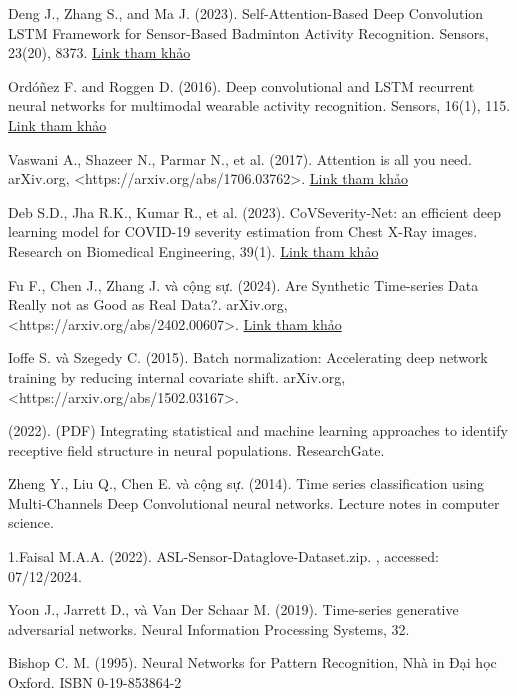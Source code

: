 \newpage
{}
\renewcommand\refname{Tài liệu tham khảo}
\begin{thebibliography}{3}
    \item Deng J., Zhang S., and Ma J. (2023). Self-Attention-Based Deep Convolution LSTM Framework for Sensor-Based Badminton Activity Recognition. Sensors, 23(20), 8373. \href{https://doi.org/10.3390/s23208373}{Link tham khảo}
    \item Ordóñez F. and Roggen D. (2016). Deep convolutional and LSTM recurrent neural networks for multimodal wearable activity recognition. Sensors, 16(1), 115. \href{https://doi.org/10.3390/s16010115}{Link tham khảo}
    \item Vaswani A., Shazeer N., Parmar N., et al. (2017). Attention is all you need. arXiv.org, <https://arxiv.org/abs/1706.03762>. \href{https://arxiv.org/abs/1706.03762}{Link tham khảo}
    \item Deb S.D., Jha R.K., Kumar R., et al. (2023). CoVSeverity-Net: an efficient deep learning model for COVID-19 severity estimation from Chest X-Ray images. Research on Biomedical Engineering, 39(1). \href{https://doi.org/10.1007/s42662-022-00377-1}{Link tham khảo}
    \item Fu F., Chen J., Zhang J. và cộng sự. (2024). Are Synthetic Time-series Data Really not as Good as Real Data?. arXiv.org, <https://arxiv.org/abs/2402.00607>. \href{https://arxiv.org/abs/2402.00607}{Link tham khảo}
    \item Ioffe S. và Szegedy C. (2015). Batch normalization: Accelerating deep network training by reducing internal covariate shift. arXiv.org, <https://arxiv.org/abs/1502.03167>.
    \item (2022). (PDF) Integrating statistical and machine learning approaches to identify receptive field structure in neural populations. ResearchGate.
    \item Zheng Y., Liu Q., Chen E. và cộng sự. (2014). Time series classification using Multi-Channels Deep Convolutional neural networks. Lecture notes in computer science.
    \item 1.Faisal M.A.A. (2022). ASL-Sensor-Dataglove-Dataset.zip. , accessed: 07/12/2024.
    \item Yoon J., Jarrett D., và Van Der Schaar M. (2019). Time-series generative adversarial networks. Neural Information Processing Systems, 32.
    \item Bishop C. M. (1995). Neural Networks for Pattern Recognition, Nhà in Đại học Oxford. ISBN 0-19-853864-2

\end{thebibliography}
